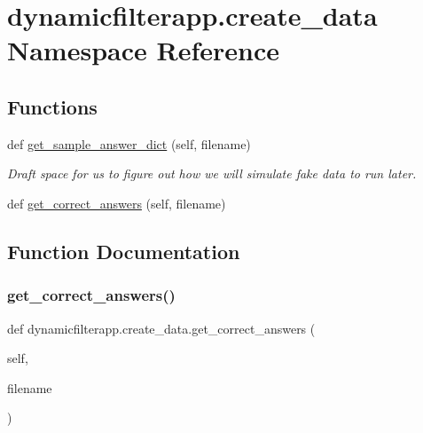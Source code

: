 \hypertarget{namespacedynamicfilterapp_1_1create__data}{}\section{dynamicfilterapp.\+create\+\_\+data Namespace Reference}
\label{namespacedynamicfilterapp_1_1create__data}
\subsection*{Functions}
\begin{DoxyCompactItemize}
\item 
def \mbox{\hyperlink{namespacedynamicfilterapp_1_1create__data_aa24df140d2fa59bb933f5488cd72cb31}{get\+\_\+sample\+\_\+answer\+\_\+dict}} (self, filename)
\begin{DoxyCompactList}\small\item\em Draft space for us to figure out how we will simulate fake data to run later. \end{DoxyCompactList}\item 
def \mbox{\hyperlink{namespacedynamicfilterapp_1_1create__data_a2d344fba9c998f5b83a36ee3db387806}{get\+\_\+correct\+\_\+answers}} (self, filename)
\end{DoxyCompactItemize}


\subsection{Function Documentation}
\mbox{\label{namespacedynamicfilterapp_1_1create__data_a2d344fba9c998f5b83a36ee3db387806}} 
\subsubsection{\texorpdfstring{get\_correct\_answers()}{get\_correct\_answers()}}
{\footnotesize\ttfamily def dynamicfilterapp.\+create\+\_\+data.\+get\+\_\+correct\+\_\+answers (\begin{DoxyParamCaption}\item[{}]{self,  }\item[{}]{filename }\end{DoxyParamCaption})}

